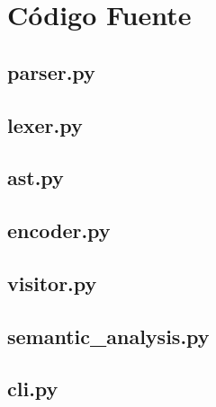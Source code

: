 \documentclass[a4paper,8pt]{article}
\begin{document}
\newpage
\section{Código Fuente}

\subsection{parser.py}
\begin{small}
  
\end{small}
\newpage
\subsection{lexer.py}
\begin{small}
  
\end{small}
\newpage
\subsection{ast.py}
\begin{small}
  
\end{small}
\newpage
\subsection{encoder.py}
\begin{small}
  
\end{small}
\newpage
\subsection{visitor.py}
\begin{small}
  
\end{small}
\newpage
\subsection{semantic\_analysis.py}
\begin{small}
  
\end{small}
\newpage
\subsection{cli.py}
\begin{small}
  
\end{small}
\newpage
\end{document}
